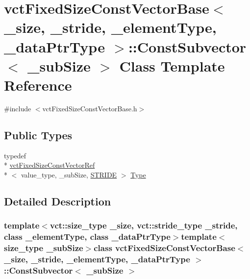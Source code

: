 \hypertarget{classvct_fixed_size_const_vector_base_1_1_const_subvector}{\section{vct\-Fixed\-Size\-Const\-Vector\-Base$<$ \-\_\-size, \-\_\-stride, \-\_\-element\-Type, \-\_\-data\-Ptr\-Type $>$\-:\-:Const\-Subvector$<$ \-\_\-sub\-Size $>$ Class Template Reference}
\label{classvct_fixed_size_const_vector_base_1_1_const_subvector}
}


{\ttfamily \#include $<$vct\-Fixed\-Size\-Const\-Vector\-Base.\-h$>$}

\subsection*{Public Types}
\begin{DoxyCompactItemize}
\item 
typedef \\*
\hyperlink{classvct_fixed_size_const_vector_ref}{vct\-Fixed\-Size\-Const\-Vector\-Ref}\\*
$<$ value\-\_\-type, \-\_\-sub\-Size, \hyperlink{classvct_fixed_size_const_vector_base_a8b833ecc64bf9196c1a89a56d6f11ebbaddc2fa94f972a3bf4df3a35bec4bdc48}{S\-T\-R\-I\-D\-E} $>$ \hyperlink{classvct_fixed_size_const_vector_base_1_1_const_subvector_abe0d01ccc90fb2baf14abd8706c8de68}{Type}
\end{DoxyCompactItemize}


\subsection{Detailed Description}
\subsubsection*{template$<$vct\-::size\-\_\-type \-\_\-size, vct\-::stride\-\_\-type \-\_\-stride, class \-\_\-element\-Type, class \-\_\-data\-Ptr\-Type$>$template$<$size\-\_\-type \-\_\-sub\-Size$>$class vct\-Fixed\-Size\-Const\-Vector\-Base$<$ \-\_\-size, \-\_\-stride, \-\_\-element\-Type, \-\_\-data\-Ptr\-Type $>$\-::\-Const\-Subvector$<$ \-\_\-sub\-Size $>$}

